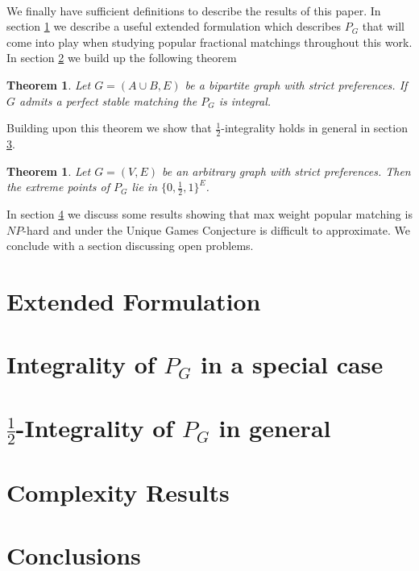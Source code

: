 \documentclass[letterpaper,12pt,oneside,onecolumn]{article}
\newtheorem{theorem}[fact]{Theorem}
\begin{document}
\paragraph{}
We finally have sufficient definitions to describe the results of this paper. In section \ref{sec:formulation} we describe a useful extended formulation which describes $P_G$ that will come into play when studying popular fractional matchings throughout this work. In section \ref{sec:special} we build up the following theorem
\begin{theorem}\label{th:special}
Let $G = (A \cup B, E)$ be a bipartite graph with strict preferences. If $G$ admits a perfect stable matching the $P_G$ is integral.
\end{theorem}
Building upon this theorem we show that $\frac{1}{2}$-integrality holds in general in section \ref{sec:general}.
\begin{theorem}
Let $G=(V,E)$ be an arbitrary graph with strict preferences. Then the extreme points of $P_G$ lie in $\{0,\frac{1}{2}, 1\}^E$.
\end{theorem}
In section \ref{sec:complexity} we discuss some results showing that max weight popular matching is $NP$-hard and under the Unique Games Conjecture is difficult to approximate. We conclude with a section discussing open problems.
\section{Extended Formulation}\label{sec:formulation}

\section{Integrality of $P_G$ in a special case}\label{sec:special}

\section{$\frac{1}{2}$-Integrality of $P_G$ in general}\label{sec:general}

\section{Complexity Results}\label{sec:complexity}

\section{Conclusions}



\end{document}
